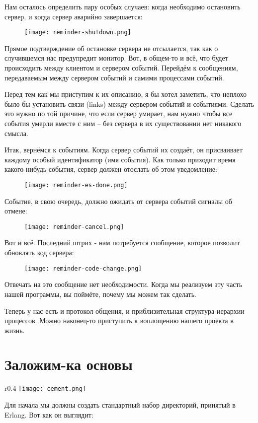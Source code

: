 Нам осталось определить пару особых случаев: когда необходимо остановить сервер, и когда сервер аварийно завершается:
\begin{figure}[h!]
    \centering
    \texttt{[image: reminder-shutdown.png]}
\end{figure}

Прямое подтверждение об остановке  сервера не отсылается, так как о случившемся нас предупредит монитор.
Вот, в общем\--то и всё, что будет происходить между клиентом и сервером событий.
Перейдём к сообщениям, передаваемым между сервером событий и самими процессами событий.

Перед тем как мы приступим к их описанию, я бы хотел заметить, что неплохо было бы установить связи (links)  между сервером событий и событиями.
Сделать это нужно по той причине, что если сервер умирает, нам нужно чтобы все события умерли вместе с ним \--- без сервера в их существовании нет никакого смысла.

Итак, вернёмся к событиям.
Когда сервер событий их создаёт, он присваивает каждому особый идентификатор (имя события).
Как только приходит время какого\--нибудь события, сервер должен отослать об этом уведомление:
\begin{figure}[h!]
    \centering
    \texttt{[image: reminder-es-done.png]}
\end{figure}

\clearpage
Событие, в свою очередь, должно ожидать от сервера событий сигналы об отмене:
\begin{figure}[h!]
    \centering
    \texttt{[image: reminder-cancel.png]}
\end{figure}

Вот и всё.
Последний штрих - нам потребуется сообщение, которое позволит обновлять код сервера:
\begin{figure}[h!]
    \centering
    \texttt{[image: reminder-code-change.png]}
\end{figure}

Отвечать на это сообщение нет необходимости.
Когда мы реализуем эту часть нашей программы, вы поймёте, почему мы можем так сделать.

Теперь у нас есть и протокол общения, и приблизительная структура иерархии процессов.
Можно наконец\--то приступить к воплощению нашего проекта в жизнь.
\section{Заложим\--ка основы}
\label{lay-them-foundations}
\begin{wrapfigure}{r}{0.4\linewidth}
    \texttt{[image: cement.png]}
\end{wrapfigure}
Для начала мы должны создать стандартный набор директорий, принятый в Erlang.
Вот как он выглядит:

